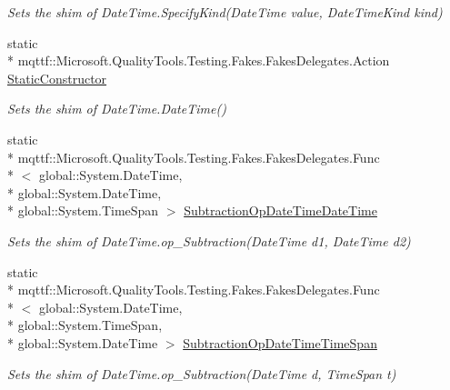 \begin{DoxyCompactItemize}
\begin{DoxyCompactList}\small\item\em Sets the shim of Date\-Time.\-Specify\-Kind(\-Date\-Time value, Date\-Time\-Kind kind)\end{DoxyCompactList}\item 
static \\*
mqttf\-::\-Microsoft.\-Quality\-Tools.\-Testing.\-Fakes.\-Fakes\-Delegates.\-Action \hyperlink{class_system_1_1_fakes_1_1_shim_date_time_a501f3eccd011392e0424f080ef57eb91}{Static\-Constructor}
\begin{DoxyCompactList}\small\item\em Sets the shim of Date\-Time.\-Date\-Time()\end{DoxyCompactList}\item 
static \\*
mqttf\-::\-Microsoft.\-Quality\-Tools.\-Testing.\-Fakes.\-Fakes\-Delegates.\-Func\\*
$<$ global\-::\-System.\-Date\-Time, \\*
global\-::\-System.\-Date\-Time, \\*
global\-::\-System.\-Time\-Span $>$ \hyperlink{class_system_1_1_fakes_1_1_shim_date_time_ae49e34170688a781ced9a67c1f7df3ec}{Subtraction\-Op\-Date\-Time\-Date\-Time}
\begin{DoxyCompactList}\small\item\em Sets the shim of Date\-Time.\-op\-\_\-\-Subtraction(\-Date\-Time d1, Date\-Time d2)\end{DoxyCompactList}\item 
static \\*
mqttf\-::\-Microsoft.\-Quality\-Tools.\-Testing.\-Fakes.\-Fakes\-Delegates.\-Func\\*
$<$ global\-::\-System.\-Date\-Time, \\*
global\-::\-System.\-Time\-Span, \\*
global\-::\-System.\-Date\-Time $>$ \hyperlink{class_system_1_1_fakes_1_1_shim_date_time_a2e0ddf7d1af519438116c997ef18a61b}{Subtraction\-Op\-Date\-Time\-Time\-Span}
\begin{DoxyCompactList}\small\item\em Sets the shim of Date\-Time.\-op\-\_\-\-Subtraction(\-Date\-Time d, Time\-Span t)\end{DoxyCompactList}\item 

\end{DoxyCompactItemize}
